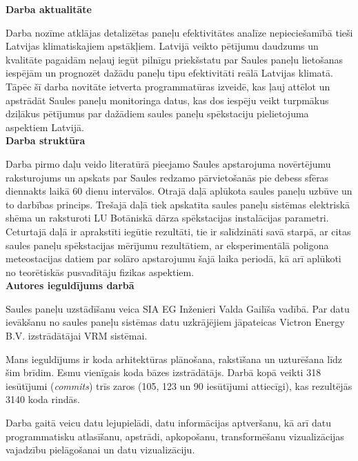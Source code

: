 \textbf{Darba aktualitāte}

Darba nozīme atklājas detalizētas paneļu efektivitātes analīze nepieciešamībā tieši Latvijas klimatiskajiem apstākļiem. Latvijā veikto pētījumu daudzums un kvalitāte pagaidām neļauj iegūt pilnīgu priekšstatu par Saules paneļu lietošanas iespējām un prognozēt dažādu paneļu tipu efektivitāti reālā Latvijas klimatā. Tāpēc šī darba novitāte ietverta programmatūras izveidē, kas ļauj attēlot un apstrādāt Saules paneļu monitoringa datus, kas dos iespēju veikt turpmākus dziļākus pētījumus par dažādiem saules paneļu spēkstaciju pielietojuma aspektiem Latvijā.\\

\textbf{Darba struktūra}

Darba pirmo daļu veido literatūrā pieejamo Saules apstarojuma novērtējumu raksturojums un apskats par Saules redzamo pārvietošanās pie debess sfēras diennakts laikā 60 dienu intervālos. Otrajā daļā aplūkota saules paneļu uzbūve un to darbības princips. Trešajā daļā tiek apskatīta saules paneļu sistēmas elektriskā shēma un raksturoti LU Botāniskā dārza spēkstacijas instalācijas parametri.
Ceturtajā daļā ir aprakstīti iegūtie rezultāti, tie ir salīdzināti savā starpā, ar citas saules paneļu spēkstacijas mērījumu rezultātiem, ar eksperimentālā poligona meteostacijas datiem par solāro apstarojumu šajā laika periodā, kā arī aplūkoti no teorētiskās pusvadītāju fizikas aspektiem.\\

\textbf{Autores ieguldījums darbā}

Saules paneļu uzstādīšanu veica SIA EG Inženieri Valda Gailīša vadībā.
Par datu ievākšanu no saules paneļu sistēmas datu uzkrājējiem jāpateicas Victron Energy B.V. izstrādātājai VRM sistēmai.

Mans ieguldījums ir koda arhitektūras plānošana, rakstīšana un uzturēšana līdz šim brīdim. Esmu vienīgais koda bāzes izstrādātājs. Darbā kopā veikti 318 iesūtījumi (\textit{commits}) trīs zaros (105, 123 un 90 iesūtījumi attiecīgi), kas rezultējās 3140 koda rindās. 

Darba gaitā veicu datu lejupielādi, datu informācijas aptveršanu, kā arī datu programmatisku atlasīšanu, apstrādi, apkopošanu, transformēšanu vizualizācijas vajadzību pielāgošanai un datu vizualizāciju. 

